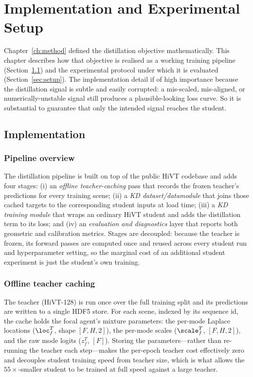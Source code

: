 \chapter{Implementation and Experimental Setup}
\label{ch:impl}

Chapter~\ref{ch:method} defined the distillation objective mathematically. This
chapter describes how that objective is realised as a working training pipeline
(Section~\ref{sec:impl}) and the experimental protocol under which it is evaluated
(Section~\ref{sec:setup}). The implementation detail if of high importance 
because the distillation signal is subtle and easily corrupted: a mis-scaled,
mis-aligned, or numerically-unstable signal still produces a plausible-looking loss curve. 
So it is substantial to guarantee that only the intended
signal reaches the student.

\section{Implementation}
\label{sec:impl}

\subsection{Pipeline overview}
\label{ssec:impl_overview}
The distillation pipeline is built on top of the public HiVT codebase and adds four
stages: (i) an \emph{offline teacher-caching} pass that records the frozen
teacher's predictions for every training scene; (ii) a \emph{KD dataset/datamodule}
that joins those cached targets to the corresponding student inputs at load time;
(iii) a \emph{KD training module} that wraps an ordinary HiVT student and adds the
distillation term to its loss; and (iv) an \emph{evaluation and diagnostics} layer
that reports both geometric and calibration metrics. Stages are decoupled: because
the teacher is frozen, its forward passes are computed once and reused across every
student run and hyperparameter setting, so the marginal cost of an additional
student experiment is just the student's own training.

\subsection{Offline teacher caching}
\label{ssec:impl_cache}
The teacher (HiVT-128) is run once over the full training split and its predictions
are written to a single HDF5 store. For each scene, indexed by its sequence id, the
cache holds the focal agent's mixture parameters: the per-mode Laplace locations
($\loc^T_f$, shape $[F,H,2]$), the per-mode scales ($\scale^T_f$, $[F,H,2]$), and
the raw mode logits ($z^T_f$, $[F]$). Storing the parameters---rather than
re-running the teacher each step---makes the per-epoch teacher cost effectively
zero and decouples student training speed from teacher size, which is what allows
the $55\times$-smaller student to be trained at full speed against a large teacher.


